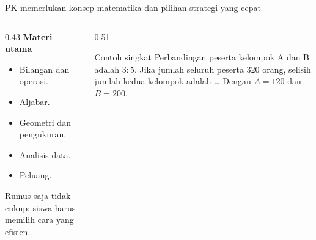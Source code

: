 \begin{frame}{PK memerlukan konsep matematika dan pilihan strategi yang cepat}
  \begin{columns}[T,onlytextwidth]
    \begin{column}{0.43\textwidth}
      {\color{StudentBlue}\bfseries Materi utama}\par
      \begin{itemize}
        \item Bilangan dan operasi.
        \item Aljabar.
        \item Geometri dan pengukuran.
        \item Analisis data.
        \item Peluang.
      \end{itemize}
      \vspace{0.08cm}
      {\color{StudentGray}\fontsize{9.8}{12}\selectfont Rumus saja tidak cukup; siswa harus memilih cara yang efisien.}
    \end{column}
    \begin{column}{0.51\textwidth}
      \begin{block}{Contoh singkat}
        Perbandingan peserta kelompok A dan B adalah $3:5$. Jika jumlah seluruh peserta 320 orang, selisih jumlah kedua kelompok adalah \ldots
        Dengan $A=120$ dan $B=200$.\par
      \end{block}
    \end{column}
  \end{columns}
\end{frame}

